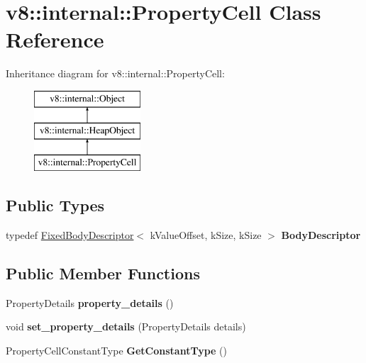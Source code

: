 \hypertarget{classv8_1_1internal_1_1_property_cell}{}\section{v8\+:\+:internal\+:\+:Property\+Cell Class Reference}
\label{classv8_1_1internal_1_1_property_cell}
Inheritance diagram for v8\+:\+:internal\+:\+:Property\+Cell\+:\begin{figure}[H]
\begin{center}
\leavevmode
\includegraphics[height=3.000000cm]{classv8_1_1internal_1_1_property_cell}
\end{center}
\end{figure}
\subsection*{Public Types}
\begin{DoxyCompactItemize}
\item 
typedef \hyperlink{classv8_1_1internal_1_1_fixed_body_descriptor}{Fixed\+Body\+Descriptor}$<$ k\+Value\+Offset, k\+Size, k\+Size $>$ {\bfseries Body\+Descriptor}\hypertarget{classv8_1_1internal_1_1_property_cell_aa261f74f109f9706cc80a50fcf3fea83}{}\label{classv8_1_1internal_1_1_property_cell_aa261f74f109f9706cc80a50fcf3fea83}

\end{DoxyCompactItemize}
\subsection*{Public Member Functions}
\begin{DoxyCompactItemize}
\item 
Property\+Details {\bfseries property\+\_\+details} ()\hypertarget{classv8_1_1internal_1_1_property_cell_a708c41145948cd884d0a138f259ff13a}{}\label{classv8_1_1internal_1_1_property_cell_a708c41145948cd884d0a138f259ff13a}

\item 
void {\bfseries set\+\_\+property\+\_\+details} (Property\+Details details)\hypertarget{classv8_1_1internal_1_1_property_cell_a937742725ab442a47662f39d0acccb05}{}\label{classv8_1_1internal_1_1_property_cell_a937742725ab442a47662f39d0acccb05}

\item 
Property\+Cell\+Constant\+Type {\bfseries Get\+Constant\+Type} ()\hypertarget{classv8_1_1internal_1_1_property_cell_ad575b8b56625ef4ce299f936c1396734}{}\label{classv8_1_1internal_1_1_property_cell_ad575b8b56625ef4ce299f936c1396734}

\end{DoxyCompactItemize}
